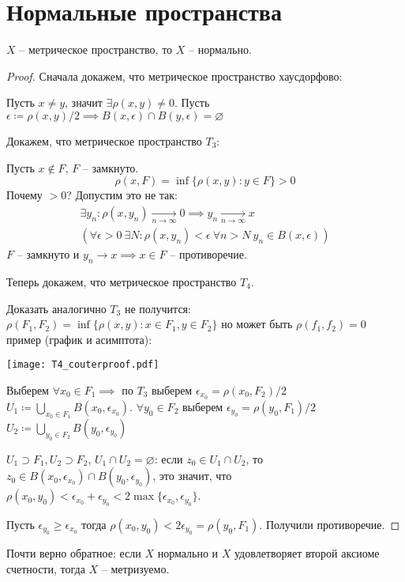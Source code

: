 \documentclass[main]{subfiles}
\begin{document}
\section{Нормальные пространства}
\begin{theorem}
    $X$ -- метрическое пространство, то $X$ -- нормально.
\end{theorem}
\begin{proof}
    Сначала докажем, что метрическое пространство хаусдорфово:

    Пусть $x \neq y$, значит $\exists \rho(x,y) \neq 0$.
    Пусть $\epsilon \coloneqq  \rho (x,y)/2 \implies B(x, \epsilon) \cap B(y, \epsilon) = \varnothing$

    Докажем, что метрическое пространство $T_3$:

    Пусть  $x \not\in F$, $F$ -- замкнуто.
    \[\rho(x, F) = \inf \{\rho(x,y): y \in F\} > 0\]
    Почему $>0$?
    Допустим это не так:
    \begin{gather*}
        \exists y_n:\rho(x, y_n) \xrightarrow[n \to \infty]{} 0 \implies y_n \xrightarrow[n \to \infty]{} x\\
        (\forall \epsilon>0\ \exists N: \rho(x, y_n) < \epsilon\ \forall n > N\ y_n \in B(x, \epsilon))
    \end{gather*}
    $F$ -- замкнуто и $y_n \to x \implies x\in F$ -- противоречие.

    Теперь докажем, что метрическое пространство $T_4$.

    Доказать аналогично $T_3$ не получится:
    $\rho(F_1, F_2) = \inf \{\rho(x,y): x \in F_1, y \in F_2\}$
    но может быть $\rho (f_1, f_2) =0$
    пример (график и асимптота):
    \begin{center}
        \texttt{[image: T4\_couterproof.pdf]}
    \end{center}

    Выберем $\forall x_0 \in F_1 \implies$ по $T_3$ выберем $\epsilon_{x_0} = \rho(x_0, F_2)/2$
    $U_1 \coloneqq \bigcup_{x_0 \in F_1} B(x_0, \epsilon_{x_0})$.
    $\forall y_0 \in F_2$ выберем $\epsilon_{y_0} = \rho(y_0, F_1)/2$
    $U_2 \coloneqq \bigcup_{y_0 \in F_2} B(y_0, \epsilon_{y_0})$

    $U_1 \supset F_1, U_2 \supset F_2$, $U_1 \cap U_2 = \varnothing$:
    если $z_0 \in U_1 \cap U_2$, то $z_0 \in B(x_0, \epsilon_{x_0}) \cap B(y_0, \epsilon_{y_0})$,
    это значит, что $\rho(x_0, y_0) < \epsilon_{x_0} + \epsilon_{y_0}< 2 \max\{\epsilon_{x_0}, \epsilon_{y_0}\}$.

    Пусть $\epsilon_{y_0} \ge \epsilon_{x_0}$ тогда $\rho(x_0, y_0) < 2 \epsilon_{y_0} = \rho(y_0, F_1)$.
    Получили противоречие.
\end{proof}
\begin{remark}
    Почти верно обратное: если $X$ нормально и $X$ удовлетворяет второй аксиоме счетности, тогда $X$ -- метризуемо.
\end{remark}
\end{document}
